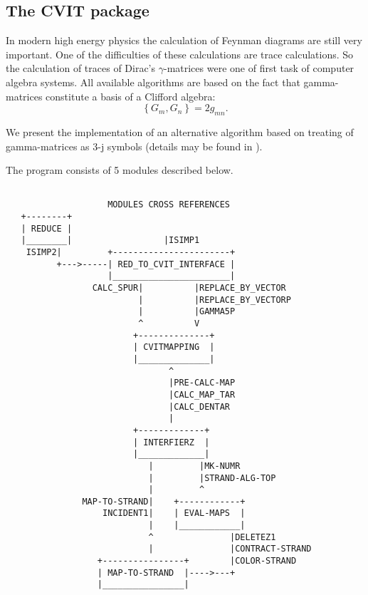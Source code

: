 
\subsection{The CVIT package}

In modern high energy physics the calculation of Feynman diagrams are
still very important. One of the difficulties of these calculations
are trace calculations. So the calculation of traces of Dirac's
$\gamma$-matrices were one of first task of computer algebra systems.
All available algorithms are based on the fact that gamma-matrices
constitute a basis of a Clifford algebra:
\begin{displaymath}
  \left\{G_{m},G_{n}\right\} = 2g_{mn}.
\end{displaymath}

We present the implementation of an alternative algorithm based on
treating of gamma-matrices as 3-j symbols (details may be found in
\cite{Ilyin:89,Kennedy:1982}).

The program consists of 5 modules described below.

\newpage
\begin{verbatim}

                    MODULES CROSS REFERENCES
   +--------+
   | REDUCE |
   |________|                  |ISIMP1
    ISIMP2|         +-----------------------+
          +--->-----| RED_TO_CVIT_INTERFACE |
                    |_______________________|
                 CALC_SPUR|          |REPLACE_BY_VECTOR
                          |          |REPLACE_BY_VECTORP
                          |          |GAMMA5P
                          ^          V
                         +--------------+
                         | CVITMAPPING  |
                         |______________|
                                ^
                                |PRE-CALC-MAP
                                |CALC_MAP_TAR
                                |CALC_DENTAR
                                |
                         +-------------+
                         | INTERFIERZ  |
                         |_____________|
                            |         |MK-NUMR
                            |         |STRAND-ALG-TOP
                            |         ^
               MAP-TO-STRAND|    +------------+
                   INCIDENT1|    | EVAL-MAPS  |
                            |    |____________|
                            ^               |DELETEZ1
                            |               |CONTRACT-STRAND
                  +----------------+        |COLOR-STRAND
                  | MAP-TO-STRAND  |---->---+
                  |________________|


\end{verbatim}


